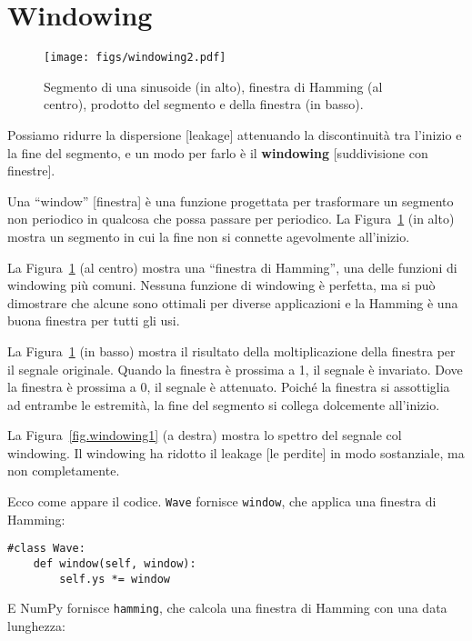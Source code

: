 \documentclass[12pt,a4paper]{book}
\begin{document}
\section{Windowing} 

\begin{figure} 

\centerline{\texttt{[image: figs/windowing2.pdf]}} \caption{Segmento di una sinusoide (in alto), finestra di Hamming (al centro), prodotto del segmento e della finestra (in basso).} \label{fig.windowing2} \end{figure} 

Possiamo ridurre la dispersione [leakage] attenuando la discontinuità tra l'inizio e la fine del segmento, e un modo per farlo è il {\bf windowing} [suddivisione con finestre].

Una ``window'' [finestra] è una funzione progettata per trasformare un segmento non periodico in qualcosa che possa passare per periodico. La Figura~\ref{fig.windowing2} (in alto) mostra un segmento in cui la fine non si connette agevolmente all'inizio.

La Figura~\ref{fig.windowing2} (al centro) mostra una ``finestra di Hamming'', una delle funzioni di windowing più comuni. Nessuna funzione di windowing è perfetta, ma si può dimostrare che alcune sono ottimali per diverse applicazioni e la Hamming è una buona finestra per tutti gli usi.

La Figura~\ref{fig.windowing2} (in basso) mostra il risultato della moltiplicazione della finestra per il segnale originale. Quando la finestra è prossima a 1, il segnale è invariato. Dove la finestra è prossima a 0, il segnale è attenuato. Poiché la finestra si assottiglia ad entrambe le estremità, la fine del segmento si collega dolcemente all'inizio.

La Figura~\ref{fig.windowing1} (a destra) mostra lo spettro del segnale col windowing. Il windowing ha ridotto il leakage [le perdite] in modo sostanziale, ma non completamente.

Ecco come appare il codice. {\tt Wave} fornisce {\tt window}, che applica una finestra di Hamming:

\begin{verbatim} 
#class Wave:
    def window(self, window):
        self.ys *= window
 \end{verbatim} 

E NumPy fornisce {\tt hamming}, che calcola una finestra di Hamming con una data lunghezza:
\end{document}
